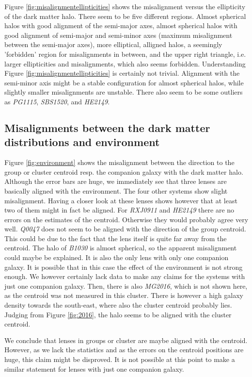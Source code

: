 \documentclass[10pt]{article}
\begin{document}
Figure \ref{fig:misalignmentellipticities} shows the misalignment versus the ellipticity of the dark matter halo. There seem to be five different regions. Almost spherical halos with good alignment of the semi-major axes, almost spherical halos with good alignment of semi-major and semi-minor axes (maximum misalignment between the semi-major axes), more elliptical, alligned halos, a seemingly 'forbidden' region for misalignments in between, and the upper right triangle, i.e. larger ellipticities and misalignments, which also seems forbidden. Understanding Figure \ref{fig:misalignmentellipticities} is certainly not trivial. Alignment with the semi-minor axis might be a stable configuration for almost spherical halos, while slightly smaller misalignments are unstable. There also seem to be some outliers as \textit{PG1115}, \textit{SBS1520}, and \textit{HE2149}.


\subsection{Misalignments between the dark matter distributions and environment}
Figure \ref{fig:environment} shows the misalignment between the direction to the group or cluster centroid resp. the companion galaxy with the dark matter halo. Although the error bars are huge, we immediately see that three lenses are basically aligned with the environment. The four other systems show slight misalignment. Having a closer look at these lenses shows however that at least two of them might in fact be aligned. For \textit{RXJ0911} and \textit{HE2149} there are no errors on the estimates of the centroid. Otherwise they would probably agree very well. \textit{Q0047} does not seem to be aligned with the direction of the group centroid. This could be due to the fact that the lens itself is quite far away from the centroid. The halo of \textit{B1030} is almost spherical, so the apparent misalignment could maybe be explained. It is also the only lens with only one companion galaxy. It is possible that in this case the effect of the environment is not strong enough. We however certainly lack data to make any claims for the systems with just one companion galaxy. Then, there is also \textit{MG2016}, which is not shown here, as the centroid was not measured in this cluster. There is however a high galaxy density towards the south-east, where also the cluster centroid probably lies. Judging from Figure \ref{fig:2016}, the halo seems to be aligned with the cluster centroid.

We conclude that lenses in groups or cluster are maybe aligned with the centroid. However, as we lack the statistics and as the errors on the centroid positions are huge, this claim might be disproved. It is not possible at this point to make a similar statement for lenses with just one companion galaxy.
\end{document}
